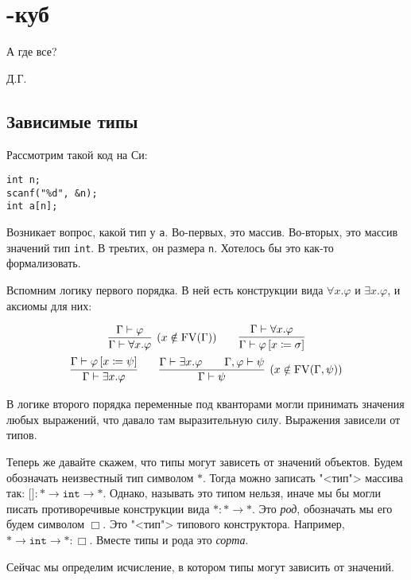 \section{\texorpdfstring{\textlambda-куб}{Lambda cube}}
\epigraph{А где все?}{Д.Г.}

\subsection{\texorpdfstring{Зависимые типы}{Depended types}}

Рассмотрим такой код на Си:
\begin{verbatim}
int n;
scanf("%d", &n);
int a[n];
\end{verbatim}
Возникает вопрос, какой тип у \texttt{a}.
Во-первых, это массив. Во-вторых, это массив значений тип \texttt{int}. В треьтих, он размера \texttt{n}.
Хотелось бы это как-то формализовать.

Вспомним логику первого порядка.
В ней есть конструкции вида $\forall x . \varphi$ и $\exists x . \varphi$, и аксиомы для них: %
\begin{@empty}
\inferspacing
\begin{gather*}
    \infer[(x \notin \FV(\Gamma))]{\Gamma \vdash \forall x . \varphi}{\Gamma \vdash \varphi} \qquad
    \infer{\Gamma \vdash \varphi \left[x \coloneqq \sigma\right]}{\Gamma \vdash \forall x . \varphi} \\
    \infer{\Gamma \vdash \exists x . \varphi}{\Gamma \vdash \varphi \left[x \coloneqq \psi\right]} \qquad
    \infer[(x \notin \FV(\Gamma, \psi))]{\Gamma \vdash \psi}{\Gamma \vdash \exists x . \varphi && \Gamma, \varphi \vdash \psi}
\end{gather*}
\end{@empty}%
В логике второго порядка переменные под кванторами могли принимать значения любых выражений, что давало там выразительную силу.
Выражения зависели от типов.

Теперь же давайте скажем, что типы могут зависеть от значений объектов.
Будем обозначать неизвестный тип символом $*$.
Тогда можно записать "<тип"> массива так: $\texttt{[]}: * \to \texttt{int} \to *$.
Однако, называть это типом нельзя, иначе мы бы могли писать противоречивые конструкции вида $* : * \to *$.
Это \emph{род}, обозначать мы его будем символом $\Box$. Это "<тип"> типового конструктора.
Например, $* \to \texttt{int} \to * : \Box$.
Вместе типы и рода это \emph{сорта}.

Сейчас мы определим исчисление, в котором типы могут зависить от значений.

